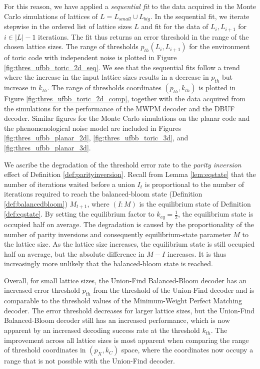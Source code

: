 For this reason, we have applied a \emph{sequential fit} to the data acquired in the Monte Carlo simulations of lattices of $L = L_{small} \cup L_{big}$. In the sequential fit, we iterate stepwise in the ordered list of lattice sizes $L$ and fit for the data of $L_i, L_{i+1}$ for $i \in |L|-1$ iterations. The fit thus returns an error threshold in the range of the chosen lattice sizes. The range of thresholds $p_{th}(L_i, L_{i+1})$ for the environment of toric code with independent noise is plotted in Figure \ref{fig:thres_ufbb_toric_2d_seq}. We see that the sequential fits follow a trend where the increase in the input lattice sizes results in a decrease in $p_{th}$ but increase in $k_{th}$. The range of thresholds coordinates $(p_{th}, k_{th})$ is plotted in Figure \ref{fig:thres_ufbb_toric_2d_comp}, together with the data acquired from the simulations for the performance of the MWPM decoder and the DBUF decoder. Similar figures for the Monte Carlo simulations on the planar code and the phenomenological noise model are included in Figures \ref{fig:thres_ufbb_planar_2d}, \ref{fig:thres_ufbb_toric_3d}, and \ref{fig:thres_ufbb_planar_3d}. 

We ascribe the degradation of the threshold error rate to the \emph{parity inversion} effect of Definition \ref{def:parityinversion}. Recall from Lemma \ref{lem:eqstate} that the number of iterations waited before a union $I_t$ is proportional to the number of iterations required to reach the balanced-bloom state (Definition \ref{def:balancedbloom}) $M_{t+1}$, where $(I:M)$ is the equilibrium state of Definition \ref{def:eqstate}. By setting the equilibrium factor to $k_{eq}=\frac{1}{2}$, the equilibrium state is occupied half on average. The degradation is caused by the proportionality of the number of parity inversions and consequently equilibrium-state parameter $M$ to the lattice size. As the lattice size increases, the equilibrium state is still occupied half on average, but the absolute difference in $M-I$ increases. It is thus increasingly more unlikely that the balanced-bloom state is reached. 

Overall, for small lattice sizes, the Union-Find Balanced-Bloom decoder has an increased error threshold $p_{th}$ from the threshold of the Union-Find decoder and is comparable to the threshold values of the Minimum-Weight Perfect Matching decoder. The error threshold decreases for larger lattice sizes, but the Union-Find Balanced-Bloom decoder still has an increased performance, which is now apparent by an increased decoding success rate at the threshold $k_{th}$. The improvement across all lattice sizes is most apparent when comparing the range of threshold coordinates in $(p_X, k_C)$ space, where the coordinates now occupy a range that is not possible with the Union-Find decoder. 


